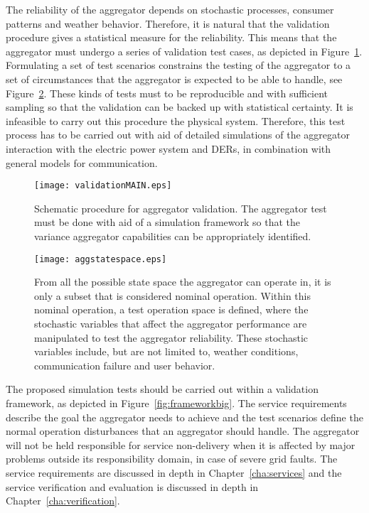 The reliability of the aggregator depends on stochastic processes, \eg consumer patterns and weather behavior. Therefore, it is natural that the validation procedure gives a statistical measure for the reliability. This means that the aggregator must undergo a series of validation test cases, as depicted in Figure~\ref{fig:MAINframework}. Formulating a set of test scenarios constrains the testing of the aggregator to a set of circumstances that the aggregator is expected to be able to handle, see Figure~\ref{fig:aggstatespace}. These kinds of tests must to be reproducible and with sufficient sampling so that the validation can be backed up with statistical certainty. It is infeasible to carry out this procedure the physical system. Therefore, this test process has to be carried out with aid of detailed simulations of the aggregator interaction with the electric power system and DERs, in combination with general models for communication.
\begin{figure}[htbp!]
\centering
\texttt{[image: validationMAIN.eps]}
\caption{Schematic procedure for aggregator validation. The aggregator test must be done with aid of a simulation framework so that the variance aggregator capabilities can be appropriately identified.}
\label{fig:MAINframework}
\end{figure}

\begin{figure}[hpb!]
\centering
\texttt{[image: aggstatespace.eps]}
\caption{From all the possible state space the aggregator can operate in, it is only a subset that is considered nominal operation. Within this nominal operation, a test operation space is defined, where the stochastic variables that affect the aggregator performance are manipulated to test the aggregator reliability. These stochastic variables include, but are not limited to, weather conditions, communication failure and user behavior.}
\label{fig:aggstatespace}
\end{figure}

The proposed simulation tests should be carried out within a validation framework, as depicted in Figure~\ref{fig:frameworkbig}. The service requirements describe the goal the aggregator needs to achieve and the test scenarios define the normal operation disturbances that an aggregator should handle. The aggregator will not be held responsible for service non-delivery when it is affected by major problems outside its responsibility domain, \eg in case of severe grid faults. The service requirements are discussed in depth in Chapter~\ref{cha:services} and the service verification and evaluation is discussed in depth in Chapter~\ref{cha:verification}.

